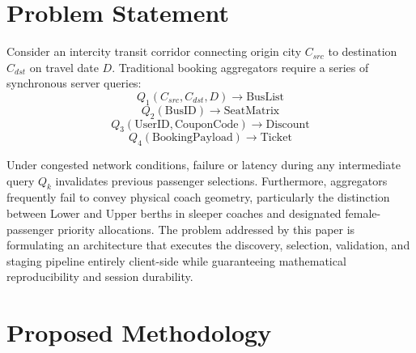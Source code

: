\documentclass[conference]{IEEEtran}
\begin{document}
\section{Problem Statement}
Consider an intercity transit corridor connecting origin city $C_{src}$ to destination $C_{dst}$ on travel date $D$. Traditional booking aggregators require a series of synchronous server queries:
\begin{equation}
    Q_1(C_{src}, C_{dst}, D) \rightarrow \text{BusList}
\end{equation}
\begin{equation}
    Q_2(\text{BusID}) \rightarrow \text{SeatMatrix}
\end{equation}
\begin{equation}
    Q_3(\text{UserID}, \text{CouponCode}) \rightarrow \text{Discount}
\end{equation}
\begin{equation}
    Q_4(\text{BookingPayload}) \rightarrow \text{Ticket}
\end{equation}

Under congested network conditions, failure or latency during any intermediate query $Q_k$ invalidates previous passenger selections. Furthermore, aggregators frequently fail to convey physical coach geometry, particularly the distinction between Lower and Upper berths in sleeper coaches and designated female-passenger priority allocations. The problem addressed by this paper is formulating an architecture that executes the discovery, selection, validation, and staging pipeline entirely client-side while guaranteeing mathematical reproducibility and session durability.

\section{Proposed Methodology}
\end{document}
